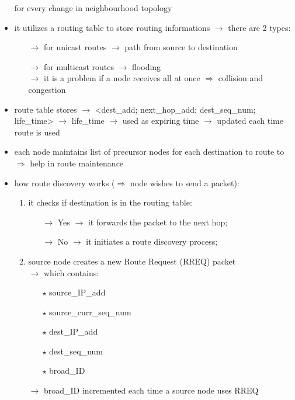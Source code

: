 \begin{itemize}
        for every change in neighbourhood topology
    \item it utilizes a routing table to store routing informations $\rightarrow$ there are 2 types:
    \begin{itemize}
        \item[$\rightarrow$] for unicast routes $\rightarrow$ path from source to destination
        \item[$\rightarrow$] for multicast routes $\rightarrow$ flooding\\
        $\rightarrow$ it is a problem if a node receives all at once $\Rightarrow$ collision and congestion
    \end{itemize}
    \item route table stores $\rightarrow$ <dest\_add; next\_hop\_add; dest\_seq\_num; life\_time>
    $\rightarrow$ life\_time $\rightarrow$ used as expiring time $\rightarrow$ updated each time route is used
    \item each node maintains list of precursor nodes for each destination to route to\\$\Rightarrow$ help in route maintenance
    \newpage
    \item how route discovery works ($\Rightarrow$ node wishes to send a packet):
    \begin{enumerate}
        \item it checks if destination is in the routing table:
        \begin{itemize}
            \item[$\rightarrow$] Yes $\rightarrow$ it forwards the packet to the next hop;
            \item[$\rightarrow$] No $\rightarrow$ it initiates a route discovery process;
        \end{itemize}
        \item source node creates a new Route Request (RREQ) packet\\
        $\rightarrow$ which contains:
        \begin{itemize}
            \item[$\star$] source\_IP\_add
            \item[$\star$] source\_curr\_seq\_num
            \item[$\star$] dest\_IP\_add
            \item[$\star$] dest\_seq\_num
            \item[$\star$] broad\_ID
        \end{itemize}
        $\rightarrow$ broad\_ID incremented each time a source node uses RREQ

\end{enumerate}
\end{itemize}
